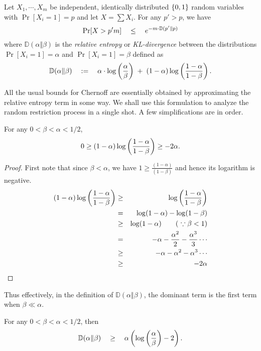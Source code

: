\begin{lemma}\label{lem:chernoff-stronger}
Let $X_1,\cdots, X_m$ be independent, identically distributed $\left\{0,1\right\}$ random variables with $\Pr[X_i = 1] = p$ and let $X = \sum X_i$. For any $p' > p$, we have
\[
\Pr[X >p' m] \quad \leq \quad e^{-m \cdot \mathbb{D}(p' \Vert p)}
\]
where $\mathbb{D}(\alpha \Vert \beta)$ is the \emph{relative entropy} or \emph{KL-divergence} between the distributions $\Pr[X_i=1] = \alpha$ and $\Pr[X_i=1]=\beta$ defined as
\[
\mathbb{D}(\alpha \Vert \beta) \quad := \quad \alpha \cdot \log \left(\frac{\alpha}{\beta}\right) \;+\; (1 - \alpha) \log \left(\frac{1-\alpha}{1- \beta}\right).
\]
\end{lemma}

All the usual bounds for Chernoff are essentially obtained by approximating the relative entropy term in some way. We shall use this formulation to analyze the random restriction process in a single shot. A few simplifications are in order. 

\begin{claim}\label{stronger-chernoff-secondterm}
For any $0 < \beta < \alpha < 1/2$, 
\[
0 \geq (1 - \alpha) \log\left(\frac{1 - \alpha}{1 - \beta}\right) \geq -2\alpha. 
\]
\end{claim}
\begin{proof}
First note that since $\beta < \alpha$, we have $1 \geq \frac{(1-\alpha)}{(1-\beta)}$ and hence its logarithm is negative. 
\begin{eqnarray*}
(1 - \alpha) \log\left(\frac{1 - \alpha}{1 - \beta}\right) & \geq & \log\left(\frac{1 - \alpha}{1 - \beta}\right)\\
& = & \log(1 - \alpha) - \log (1-\beta)\\
& \geq & \log(1 - \alpha)\qquad(\text{ $\because \beta < 1$})\\
& = & - \alpha - \frac{\alpha^2}{2} - \frac{\alpha^3}{3} \cdots \\
& \geq & - \alpha - \alpha^2 - \alpha^3 \cdots\\
& \geq & -2\alpha\qedhere
\end{eqnarray*}
\end{proof}
Thus effectively, in the definition of $\mathbb{D}(\alpha \Vert \beta)$, the dominant term is the first term when $\beta \ll \alpha$. 

\begin{corollary}
For any $0 < \beta < \alpha < 1/2$, then
\[
\mathbb{D}(\alpha\Vert \beta)  \quad \geq \quad  \alpha \left(\log\left(\frac{\alpha}{\beta}\right) - 2\right).
\]
\end{corollary}

